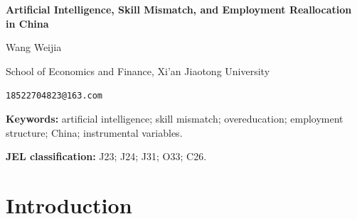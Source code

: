 \documentclass[12pt,a4paper]{article}
\theoremstyle{predstyle}
\theoremstyle{plain}
\begin{document}
\begin{center}
{\large\bfseries Artificial Intelligence, Skill Mismatch, and Employment Reallocation in China\par}
\vspace{0.8em}
{\normalsize Wang Weijia\par}
\vspace{0.2em}
{\small School of Economics and Finance, Xi'an Jiaotong University\par}
{\small \texttt{18522704823@163.com}\par}
\end{center}

\begin{abstract}
This paper asks whether firm-level AI adoption creates inclusive employment gains in China and how pre-existing skill mismatch shapes the answer. Using annual-report text measures for Chinese A-share listed firms from 2010 to 2022, I instrument overeducation and its interaction with AI using an education-expansion shift-share design, treating AI adoption itself as conditionally exogenous; a Broadband China difference-in-differences provides complementary validation. AI adoption raises total employment (IV coefficient: 0.574) and increases the high-skilled labor share by 0.109, while reducing the low-skilled share by 0.150. Overeducation weakens AI's complementarity with high-skilled labor but buffers low-skilled workers from displacement. Within the task-based framework, these employment shifts are consistent with a widening skill wage premium; pay dispersion data provide suggestive evidence: AI adoption widens the within-firm executive-to-worker compensation gap, an effect that overeducation compresses. Credential-task alignment, industry mismatch, and local institutions together determine whether AI adoption widens or contains inequality in labor-market outcomes.
\end{abstract}

\noindent\textbf{Keywords:} artificial intelligence; skill mismatch; overeducation; employment structure; China; instrumental variables.

\noindent\textbf{JEL classification:} J23; J24; J31; O33; C26.

\vspace{0.5em}

\section{Introduction}
\label{sec:intro}
\end{document}
